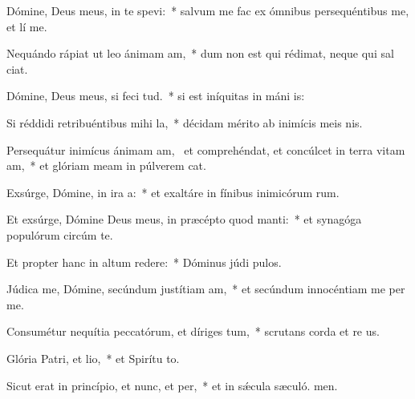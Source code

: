 \item Dómine, Deus meus, in te spevi:~* salvum me fac ex ómnibus persequéntibus me, et lí me.
\item Nequándo rápiat ut leo ánimam am,~* dum non est qui rédimat, neque qui sal ciat.
\item Dómine, Deus meus, si feci tud.~* si est iníquitas in máni is:
\item Si réddidi retribuéntibus mihi la,~* décidam mérito ab inimícis meis nis.
\item Persequátur inimícus ánimam am,~\pscross{} et comprehéndat, et concúlcet in terra vitam am,~* et glóriam meam in púlverem cat.
\item Exsúrge, Dómine, in ira a:~* et exaltáre in fínibus inimicórum rum.
\item Et exsúrge, Dómine Deus meus, in præcépto quod manti:~* et synagóga populórum circúm te.
\item Et propter hanc in altum redere:~* Dóminus júdi pulos.
\item Júdica me, Dómine, secúndum justítiam am,~* et secúndum innocéntiam me per me.
\item Consumétur nequítia peccatórum, et díriges tum,~* scrutans corda et re us.
\item Glória Patri, et lio,~* et Spirítu to.
\item Sicut erat in princípio, et nunc, et per,~* et in sǽcula sæculó. men.

